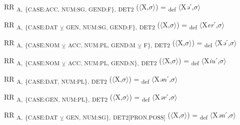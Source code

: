 {\begin{exe}
 RR \textsubscript{A,} \textsubscript{\{CASE:ACC, NUM:SG, GEND:F\},} \textsubscript{DET2} ($\langle$X,$\sigma $$\rangle$) = \textsubscript{def} $\langle$X\textit{ə}ˊ,$\sigma $$\rangle$
\end{exe}

\begin{exe}
 RR \textsubscript{A,} \textsubscript{\{CASE:DAT} \textsubscript{${\veebar}$}\textsubscript{ GEN, NUM:SG, GEND:F\},} \textsubscript{DET2} ($\langle$X,$\sigma $$\rangle$) = \textsubscript{def} $\langle$X\textit{er}ˊ,$\sigma $$\rangle$
\end{exe}

\begin{exe}
 RR \textsubscript{A,} \textsubscript{\{CASE:NOM} \textsubscript{${\veebar}$}\textsubscript{ ACC, NUM:PL, GEND:M} \textsubscript{${\veebar}$}\textsubscript{ F\},} \textsubscript{DET2} ($\langle$X,$\sigma $$\rangle$) = \textsubscript{def} $\langle$X\textit{ə}ˊ,$\sigma $$\rangle$
\end{exe}

\begin{exe}
 RR \textsubscript{A,} \textsubscript{\{CASE:NOM} \textsubscript{${\veebar}$}\textsubscript{ ACC, NUM:PL, GEND:N\},} \textsubscript{DET2} ($\langle$X,$\sigma $$\rangle$) = \textsubscript{def} $\langle$X\textit{iu}ˊ,$\sigma $$\rangle$
\end{exe}

\begin{exe}
 RR \textsubscript{A,} \textsubscript{\{CASE:DAT, NUM:PL\},} \textsubscript{DET2} ($\langle$X,$\sigma $$\rangle$) = \textsubscript{def} $\langle$X\textit{ən}ˊ,$\sigma $$\rangle$
\end{exe}

\begin{exe}
 RR \textsubscript{A,} \textsubscript{\{CASE:GEN, NUM:PL\},} \textsubscript{DET2} ($\langle$X,$\sigma $$\rangle$) = \textsubscript{def} $\langle$X\textit{ər}ˊ,$\sigma $$\rangle$
\end{exe}

\begin{exe}
 RR \textsubscript{A,} \textsubscript{\{CASE:DAT} \textsubscript{${\veebar}$}\textsubscript{ GEN, NUM:SG\},} \textsubscript{DET2[PRON.POSS]} ($\langle$X,$\sigma $$\rangle$) = \textsubscript{def} $\langle$X\textit{ən}ˊ,$\sigma $$\rangle$
\end{exe}

}
